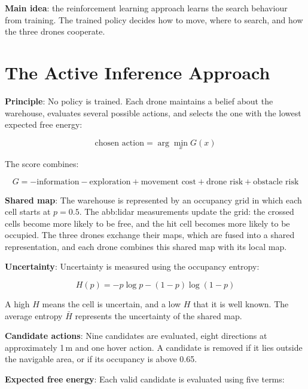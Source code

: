 \textbf{Main idea}: the reinforcement learning approach learns the search
behaviour from training. The trained policy decides how to move, where to search,
and how the three drones cooperate.

\section{The Active Inference Approach}%
\label{sec:impl:aif}

\textbf{Principle}: No policy is trained. Each drone maintains a belief about the
warehouse, evaluates several possible actions, and selects the one with the
lowest expected free energy:

\begin{equation}
    \text{chosen action} = \arg\min_x G(x)
    \label{eq:impl:argmin}
\end{equation}

The score combines:

\begin{equation}
    G = -\text{information} - \text{exploration} + \text{movement cost}
    + \text{drone risk} + \text{obstacle risk}
    \label{eq:impl:efe}
\end{equation}

\textbf{Shared map}: The warehouse is represented by an occupancy grid in which
each cell starts at $p = 0.5$. The \gls{abb:lidar} measurements update the grid:
the crossed cells become more likely to be free, and the hit cell becomes more
likely to be occupied. The three drones exchange their maps, which are fused into
a shared representation, and each drone combines this shared map with its local
map.

\textbf{Uncertainty}: Uncertainty is measured using the occupancy entropy:

\begin{equation}
    H(p) = -p \log p - (1-p) \log (1-p)
    \label{eq:impl:entropy}
\end{equation}

A high $H$ means the cell is uncertain, and a low $H$ that it is well known. The
average entropy $\bar{H}$ represents the uncertainty of the shared map.

\textbf{Candidate actions}: Nine candidates are evaluated, eight directions at
approximately 1\,m and one hover action. A candidate is removed if it lies
outside the navigable area, or if its occupancy is above 0.65.

\textbf{Expected free energy}: Each valid candidate is evaluated using five
terms:

